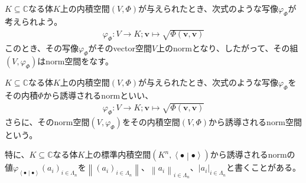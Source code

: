 \documentclass[dvipdfmx]{jsarticle}
\begin{document}
\begin{thm}\label{2.3.6.3}
$K \subseteq \mathbb{C}$なる体$K$上の内積空間$(V,\varPhi)$が与えられたとき、次式のような写像$\varphi_{\varPhi}$が考えられよう。
\begin{align*}
\varphi_{\varPhi}:V \rightarrow K;\mathbf{v} \mapsto \sqrt{\varPhi\left( \mathbf{v},\mathbf{v} \right)}
\end{align*}
このとき、その写像$\varphi_{\varPhi}$がそのvector空間$V$上のnormとなり、したがって、その組$\left( V,\varphi_{\varPhi} \right)$はnorm空間をなす。
\end{thm}
\begin{dfn}
$K \subseteq \mathbb{C}$なる体$K$上の内積空間$(V,\varPhi)$が与えられたとき、次式のような写像$\varphi_{\varPhi}$をその内積$\varPhi$から誘導されるnormといい、
\begin{align*}
\varphi_{\varPhi}:V \rightarrow K;\mathbf{v} \mapsto \sqrt{\varPhi\left( \mathbf{v},\mathbf{v} \right)}
\end{align*}
さらに、そのnorm空間$\left( V,\varphi_{\varPhi} \right)$をその内積空間$(V,\varPhi)$から誘導されるnorm空間という。\par
特に、$K \subseteq \mathbb{C}$なる体$K$上の標準内積空間$\left( K^{n},\left\langle \bullet \middle| \bullet \right\rangle \right)$から誘導されるnormの値$\varphi_{\left\langle \bullet \middle| \bullet \right\rangle}\left( a_{i} \right)_{i \in \varLambda_{n}}$を$\left\| \left( a_{i} \right)_{i \in \varLambda_{n}} \right\|$、$\left\| a_{i} \right\|_{i \in \varLambda_{n}}$、$\left| a_{i} \right|_{i \in \varLambda_{n}}$と書くことがある。
\end{dfn}
\end{document}
